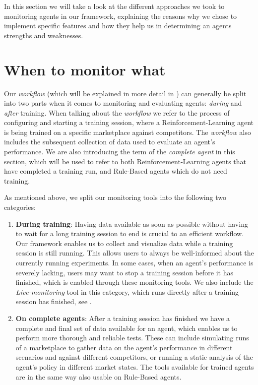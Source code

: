 \begin{jointwork}\label{ch:Approaches}
	In this section we will take a look at the different approaches we took to monitoring agents in our framework, explaining the reasons why we chose to implement specific features and how they help us in determining an agents strengths and weaknesses.
\end{jointwork}

\section{When to monitor what}\label{sec:WhenToMonitorWhat}

Our \emph{workflow} (which will be explained in more detail in ) can generally be split into two parts when it comes to monitoring and evaluating agents: \emph{during} and \emph{after} training. When talking about the \emph{workflow} we refer to the process of configuring and starting a training session, where a Reinforcement-Learning agent is being trained on a specific marketplace against competitors. The \emph{workflow} also includes the subsequent collection of data used to evaluate an agent's performance. We are also introducing the term of the \emph{complete agent} in this section, which will be used to refer to both Reinforcement-Learning agents that have completed a training run, and Rule-Based agents which do not need training.

As mentioned above, we split our monitoring tools into the following two categories:

\begin{enumerate}
	\item \textbf{During training}: Having data available as soon as possible without having to wait for a long training session to end is crucial to an efficient workflow. Our framework enables us to collect and visualize data while a training session is still running. This allows users to always be well-informed about the currently running experiments. In some cases, when an agent's performance is severely lacking, users may want to stop a training session before it has finished, which is enabled through these monitoring tools. We also include the \emph{Live-monitoring} tool in this category, which runs directly after a training session has finished, see .

	\item \textbf{On complete agents}: After a training session has finished we have a complete and final set of data available for an agent, which enables us to perform more thorough and reliable tests. These can include simulating runs of a marketplace to gather data on the agent's performance in different scenarios and against different competitors, or running a static analysis of the agent's policy in different market states. The tools available for trained agents are in the same way also usable on Rule-Based agents.
\end{enumerate}

